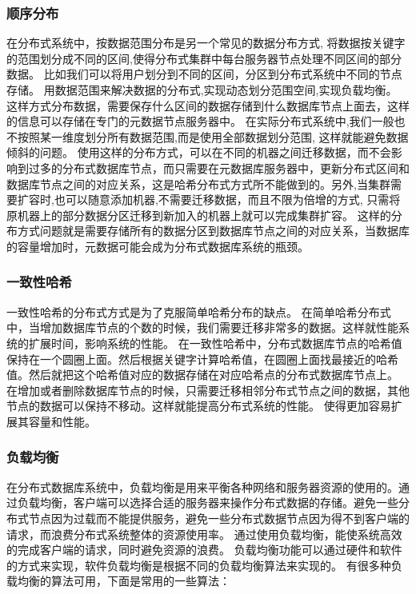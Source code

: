 \subsubsection{顺序分布}
在分布式系统中，按数据范围分布是另一个常见的数据分布方式,
将数据按关键字的范围划分成不同的区间,使得分布式集群中每台服务器节点处理不同区间的部分数据。
比如我们可以将用户划分到不同的区间，分区到分布式系统中不同的节点存储。
用数据范围来解决数据的分布式,实现动态划分范围空间,实现负载均衡。 
这样方式分布数据，需要保存什么区间的数据存储到什么数据库节点上面去，这样的信息可以存储在专门的元数据节点服务器中。 
在实际分布式系统中,我们一般也不按照某一维度划分所有数据范围,而是使用全部数据划分范围,
这样就能避免数据倾斜的问题。 
使用这样的分布方式，可以在不同的机器之间迁移数据，而不会影响到过多的分布式数据库节点，而只需要在元数据库服务器中，更新分布式区间和数据库节点之间的对应关系，这是哈希分布式方式所不能做到的。另外,当集群需要扩容时,也可以随意添加机器,不需要迁移数据，而且不限为倍增的方式,
只需将原机器上的部分数据分区迁移到新加入的机器上就可以完成集群扩容。
这样的分布方式问题就是需要存储所有的数据分区到数据库节点之间的对应关系，当数据库的容量增加时，元数据可能会成为分布式数据库系统的瓶颈。
\subsubsection{一致性哈希}
一致性哈希的分布式方式是为了克服简单哈希分布的缺点。
在简单哈希分布式中，当增加数据库节点的个数的时候，我们需要迁移非常多的数据。这样就性能系统的扩展时间，影响系统的性能。
在一致性哈希中，分布式数据库节点的哈希值保持在一个圆圈上面。然后根据关键字计算哈希值，在圆圈上面找最接近的哈希值。然后就把这个哈希值对应的数据存储在对应哈希点的分布式数据库节点上。
在增加或者删除数据库节点的时候，只需要迁移相邻分布式节点之间的数据，其他节点的数据可以保持不移动。这样就能提高分布式系统的性能。
使得更加容易扩展其容量和性能。 
\subsubsection{负载均衡}
在分布式数据库系统中，负载均衡是用来平衡各种网络和服务器资源的使用的。通过负载均衡，客户端可以选择合适的服务器来操作分布式数据的存储。避免一些分布式节点因为过载而不能提供服务，避免一些分布式数据节点因为得不到客户端的请求，而浪费分布式系统整体的资源使用率。
通过使用负载均衡，能使系统高效的完成客户端的请求，同时避免资源的浪费。
负载均衡功能可以通过硬件和软件的方式来实现，软件负载均衡是根据不同的负载均衡算法来实现的。
有很多种负载均衡的算法可用，下面是常用的一些算法：



